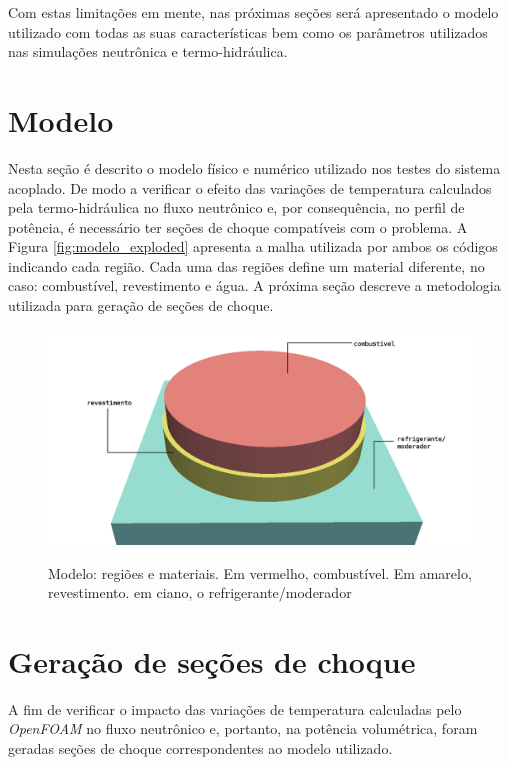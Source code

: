 Com estas limitações em mente, nas próximas seções será apresentado o modelo utilizado com todas as suas
características bem como os parâmetros utilizados nas simulações neutrônica e termo-hidráulica.

\section{Modelo}

%
%

Nesta seção é descrito o modelo físico e numérico utilizado nos testes do sistema acoplado.
De modo a verificar o efeito das variações de temperatura calculados pela termo-hidráulica
no fluxo neutrônico e, por consequência, no perfil de potência, é necessário ter seções
de choque compatíveis com o problema. A Figura \ref{fig:modelo_exploded} apresenta a malha
utilizada por ambos os códigos indicando cada região. Cada uma das regiões define um
material diferente, no caso: combustível, revestimento e água. A próxima seção descreve
a metodologia utilizada para geração de seções de choque. 

\begin{figure}[htb]
  \caption{Modelo: regiões e materiais. Em vermelho, combustível. Em amarelo, revestimento.
  em ciano, o refrigerante/moderador}
  \centering\includegraphics[scale=0.5]{figuras/regioes_surface2.png}
  \label{fig:regions}
\end{figure}

\section{Geração de seções de choque}

A fim de verificar o impacto das variações de temperatura calculadas pelo \textit{OpenFOAM} no fluxo
neutrônico e, portanto, na potência volumétrica, foram geradas seções de choque correspondentes
ao modelo utilizado.

